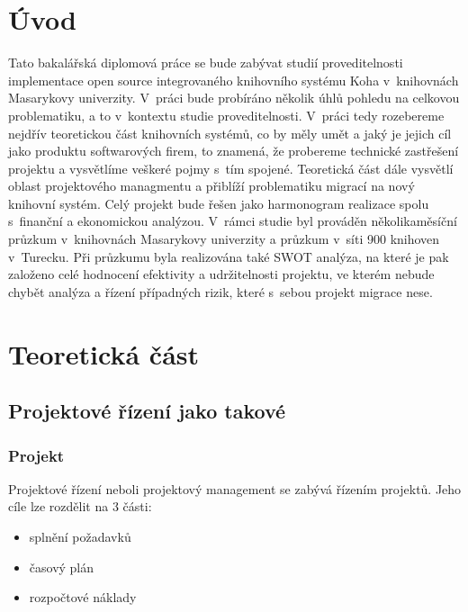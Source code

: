 \documentclass[
	11pt, oneside, printed, final, palatino, monochrome
	microtype,
	table,   %
	lof,     %
	lot     %
]{fithesis3}
\newcommand{\mezera}{\bigskip}
\begin{document}
{%


\chapter*{Úvod}
Tato bakalářská diplomová práce se bude zabývat studií proveditelnosti implementace open source integrovaného knihovního systému Koha v~knihovnách Masarykovy univerzity. V~práci bude probíráno několik úhlů pohledu na celkovou problematiku, a to v~kontextu studie proveditelnosti.  V~práci tedy rozebereme nejdřív teoretickou část knihovních systémů, co by měly umět a jaký je jejich cíl jako produktu softwarových firem, to znamená, že probereme technické zastřešení projektu a vysvětlíme veškeré pojmy s~tím spojené. Teoretická část dále vysvětlí oblast projektového managmentu a přiblíží problematiku migrací na nový knihovní systém. Celý projekt bude řešen jako harmonogram realizace spolu s~finanční a ekonomickou analýzou. V~rámci studie byl prováděn několikaměsíční průzkum v~knihovnách Masarykovy univerzity a průzkum v~síti 900 knihoven v~Turecku. Při průzkumu byla realizována také SWOT analýza, na které je pak založeno celé hodnocení efektivity a udržitelnosti projektu, ve kterém nebude chybět analýza a řízení případných rizik, které s~sebou projekt migrace nese.

\chapter{Teoretická část}

\section{Projektové řízení jako takové} \label{sec:projektove_rizeni_jako_takove}

\subsection{Projekt}

Projektové řízení neboli projektový management se zabývá řízením projektů. Jeho cíle lze rozdělit na 3 části: 
\mezera
\begin{itemize}
\item splnění požadavků
\item časový plán
\item rozpočtové náklady
\end{itemize}

}
\end{document}
